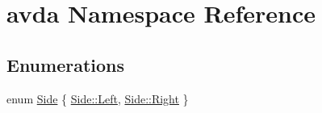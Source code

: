 \hypertarget{namespaceavda}{\section{avda Namespace Reference}
\label{namespaceavda}
}
\subsection*{Enumerations}
\begin{DoxyCompactItemize}
\item 
enum \hyperlink{namespaceavda_af723e82f0d3d45fda6fdc01f6a492786}{Side} \{ \hyperlink{namespaceavda_af723e82f0d3d45fda6fdc01f6a492786a945d5e233cf7d6240f6b783b36a374ff}{Side\+::\+Left}, 
\hyperlink{namespaceavda_af723e82f0d3d45fda6fdc01f6a492786a92b09c7c48c520c3c55e497875da437c}{Side\+::\+Right}
 \}
\end{DoxyCompactItemize}
